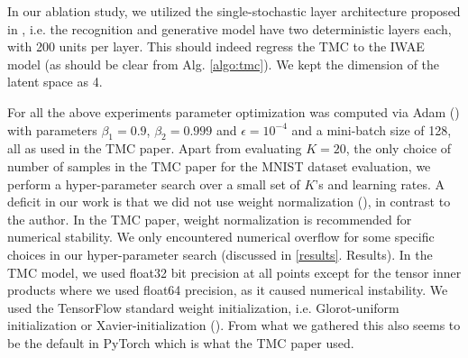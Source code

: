\documentclass{article}
\begin{document}
In our ablation study, we utilized the single-stochastic layer architecture proposed in \cite{iwae}, i.e. the recognition and generative model have two deterministic layers each, with 200 units per layer. This should indeed regress the TMC to the IWAE model (as should be clear from Alg. \ref{algo:tmc}). We kept the dimension of the latent space as 4.

For all the above experiments parameter optimization was computed via Adam (\cite{adam}) with parameters $\beta_1=0.9$, $\beta_2=0.999$ and $\epsilon=10^{-4}$ and a mini-batch size of 128, all as used in the TMC paper. Apart from evaluating $K=20$, the only choice of number of samples in the TMC paper for the MNIST dataset evaluation, we perform a hyper-parameter search over a small set of $K$'s and learning rates. A deficit in our work is that we did not use weight normalization (\cite{weightnorm}), in contrast to the author. In the TMC paper, weight normalization is recommended for numerical stability. We only encountered numerical overflow for some specific choices in our hyper-parameter search (discussed in \ref{results}. Results). In the TMC model, we used float32 bit precision at all points except for the tensor inner products where we used float64 precision, as it caused numerical instability. We used the TensorFlow standard weight initialization, i.e. Glorot-uniform initialization or Xavier-initialization (\cite{xavier}). From what we gathered this also seems to be the default in PyTorch which is what the TMC paper used.
\end{document}
